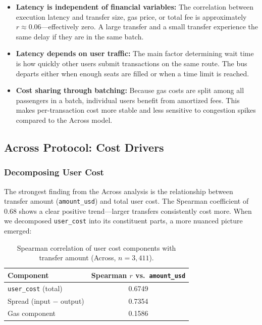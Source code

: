 \begin{itemize}
    \item \textbf{Latency is independent of financial variables:} The correlation between execution latency and transfer size, gas price, or total fee is approximately $r \approx 0.06$---effectively zero. A large transfer and a small transfer experience the same delay if they are in the same batch.

    \item \textbf{Latency depends on user traffic:} The main factor determining wait time is how quickly other users submit transactions on the same route. The bus departs either when enough seats are filled or when a time limit is reached.

    \item \textbf{Cost sharing through batching:} Because gas costs are split among all passengers in a batch, individual users benefit from amortized fees. This makes per-transaction cost more stable and less sensitive to congestion spikes compared to the Across model.
\end{itemize}

\subsection{Across Protocol: Cost Drivers}

\subsubsection{Decomposing User Cost}

The strongest finding from the Across analysis is the relationship between transfer amount (\texttt{amount\_usd}) and total user cost. The Spearman coefficient of 0.68 shows a clear positive trend---larger transfers consistently cost more. When we decomposed \texttt{user\_cost} into its constituent parts, a more nuanced picture emerged:

\begin{table}[h]
\centering
\caption{Spearman correlation of user cost components with transfer amount (Across, $n = 3{,}411$).}
\label{tab:cost_decomp}
\begin{tabular}{lc}
\toprule
\textbf{Component} & \textbf{Spearman $r$ vs.\ \texttt{amount\_usd}} \\
\midrule
\texttt{user\_cost} (total)     & 0.6749 \\
Spread (input $-$ output)       & 0.7354 \\
Gas component                   & 0.1586 \\
\bottomrule
\end{tabular}
\end{table}

